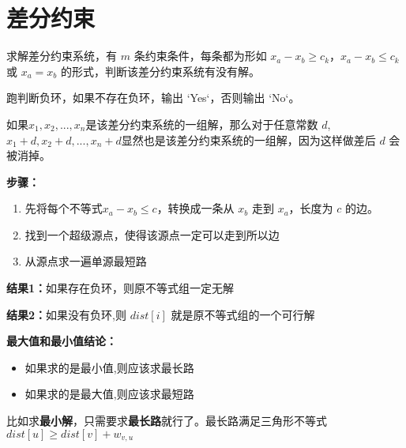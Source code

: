 \section{差分约束}

\par \noindent 求解差分约束系统，有 $m$ 条约束条件，每条都为形如 $x_a-x_b\geq c_k$，$x_a-x_b\leq c_k$ 或 $x_a=x_b$ 的形式，判断该差分约束系统有没有解。
~\\
\par \noindent 
\par \noindent 跑判断负环，如果不存在负环，输出 `Yes`，否则输出 `No`。
~\\
\par \noindent 如果${x_1,x_2,...,x_n}$是该差分约束系统的一组解，那么对于任意常数 $d$, ${x_1+d,x_2+d,...,x_n+d}$显然也是该差分约束系统的一组解，因为这样做差后 $d$ 会被消掉。
~\\
\par \noindent \textbf{步骤：} 

\begin{enumerate}
\item 先将每个不等式$x_a - x_b \leq c$，转换成一条从 $x_b$ 走到 $x_a$，长度为 $c$ 的边。
\item 找到一个超级源点，使得该源点一定可以走到所以边
\item 从源点求一遍单源最短路
\end{enumerate}

\par \noindent \textbf{结果1：}如果存在负环，则原不等式组一定无解
\par \noindent \textbf{结果2：}如果没有负环,则 $dist[i]$ 就是原不等式组的一个可行解
~\\
\par \noindent \textbf{最大值和最小值结论：}

\begin{itemize}
\item 如果求的是最小值,则应该求最长路

\item 如果求的是最大值,则应该求最短路
\end{itemize}

\par \noindent 比如求\textbf{最小解}，只需要求\textbf{最长路}就行了。最长路满足三角形不等式$dist[u]≥dist[v]+w_{v,u}$